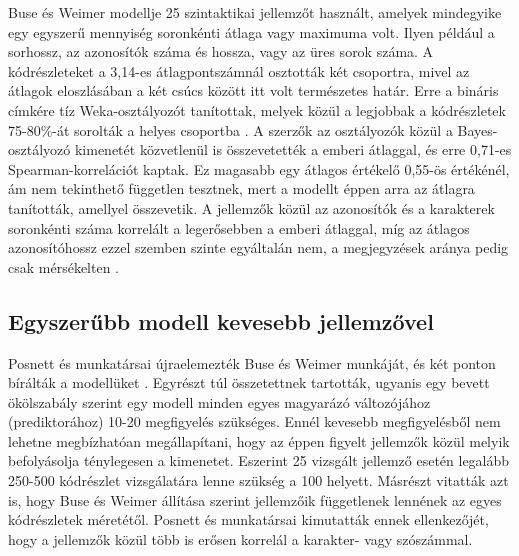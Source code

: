 \documentclass[
]{elteikthesis}[2024/04/26]
\begin{document}
Buse és Weimer modellje 25 szintaktikai jellemzőt használt, amelyek mindegyike
egy egyszerű mennyiség %
soronkénti átlaga vagy maximuma volt. Ilyen például a sorhossz, az azonosítók
száma és hossza, vagy az üres sorok száma. A kódrészleteket a 3,14-es
átlagpontszámnál osztották két csoportra, mivel az átlagok eloszlásában a két
csúcs között itt volt természetes határ. Erre a bináris címkére tíz
Weka-osztályozót %
tanítottak, melyek közül a legjobbak a kódrészletek 75-80\%-át sorolták a helyes
csoportba \cite{buse2008metric}. A szerzők az osztályozók közül a
Bayes-osztályozó kimenetét közvetlenül is összevetették a emberi átlaggal,
és erre 0,71-es Spearman-korrelációt kaptak. Ez magasabb egy átlagos értékelő
0,55-ös értékénél, ám nem tekinthető független tesztnek, mert a modellt éppen
arra az átlagra tanították, amellyel összevetik. A jellemzők közül az azonosítók
és a karakterek soronkénti száma korrelált a legerősebben a emberi átlaggal, míg
az átlagos azonosítóhossz ezzel szemben szinte egyáltalán nem, a megjegyzések
aránya pedig csak mérsékelten \cite{buse2010learning}.

\subsection{Egyszerűbb modell kevesebb jellemzővel}
\label{sec:related:models:posnett}

Posnett és munkatársai újraelemezték Buse és Weimer munkáját, és két ponton
bírálták a modellüket \cite{posnett2011simpler}. Egyrészt túl összetettnek
tartották, ugyanis egy bevett ökölszabály szerint egy modell minden egyes
magyarázó változójához (prediktorához) 10-20 megfigyelés szükséges. Ennél
kevesebb megfigyelésből nem lehetne
megbízhatóan megállapítani, hogy az éppen figyelt jellemzők közül melyik
befolyásolja ténylegesen a kimenetet. Eszerint 25 vizsgált jellemző esetén
legalább 250-500 kódrészlet vizsgálatára lenne szükség a 100 helyett.
Másrészt vitatták azt is, hogy Buse és Weimer állítása szerint jellemzőik
függetlenek lennének az egyes kódrészletek méretétől. Posnett és munkatársai
kimutatták ennek ellenkezőjét,
hogy a jellemzők közül több is erősen korrelál a karakter- vagy szószámmal.
\end{document}
